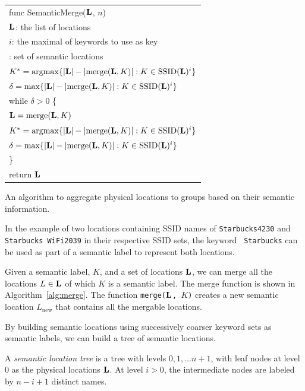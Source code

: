 \begin{algorithm}[h]
    \small
    \begin{tabular}{|l|} \hline
        func SemanticMerge($\mathbf{L}$, $n$) \\ 
        \RRR $\mathbf{L}$: the list of locations \\
        \RRR $i$: the maximal of keywords to use as key \\ 
        \RRR {\em returns}: set of semantic locations \\ \hline
        $K^* = \mathrm{argmax} \{|\mathbf{L}| - |\mathrm{merge}(\mathbf{L}, K)| : K\in\mathrm{SSID}(\mathbf{L})^i\}$ \\
        $\delta = \mathrm{max} \{|\mathbf{L}| - |\mathrm{merge}(\mathbf{L}, K)| : K\in\mathrm{SSID}(\mathbf{L})^i\}$ \\
        while $\delta > 0$ \{ \\
        \RRR $\mathbf{L} = \mathrm{merge}(\mathbf{L}, K)$ \\
        \RRR $K^* = \mathrm{argmax} \{|\mathbf{L}| - |\mathrm{merge}(\mathbf{L}, K)| : K\in\mathrm{SSID}(\mathbf{L})^i\}$ \\
        \RRR $\delta = \mathrm{max} \{|\mathbf{L}| - |\mathrm{merge}(\mathbf{L}, K)| : K\in\mathrm{SSID}(\mathbf{L})^i\}$ \\
        \}\\
        return $\mathbf{L}$ \\ \hline
    \end{tabular}
    \vspace{0.4cm}
    \caption{An algorithm to aggregate physical locations to groups based on
    their semantic information.}
    \label{alg:semantic}
\end{algorithm}



In the example of two locations containing SSID names of {\tt Starbucks4230} and
{\tt Starbucks WiFi2039} in their respective SSID sets, the keyword {\tt
Starbucks} can be used as part of a semantic label to represent both locations.

Given a semantic label, $K$, and a set of locations $\mathbf{L}$, we can merge all the
locations $L\in \mathbf{L}$ of which $K$ is a semantic label.  The merge function is
shown in Algorithm~\ref{alg:merge}.  The function {\tt merge($\mathbf{L}$, $K$)} 
creates a new semantic location $L_\mathrm{new}$ that contains all the mergable
locations.

By building semantic locations using successively coarser keyword sets as
semantic labels, we can build a tree of semantic locations.

\begin{definition}
    A {\em semantic location tree} is a tree with levels $0, 1, \dots n+1$, with leaf nodes at
    level 0 as the physical locations $\mathbf{L}$.  At level $i>0$, the intermediate
    nodes are labeled by $n-i+1$ distinct names.
\end{definition}

